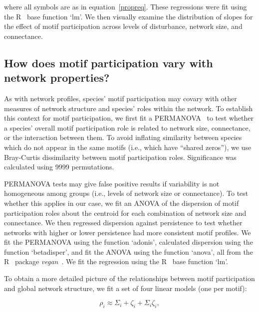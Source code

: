 \documentclass[12pt]{article}
\begin{document}
\begin{spacing}{2.0}
        where all symbols are as in equation~\ref{propreq}.
        These regressions were fit using the R~\citep{R} base function `lm'.
        We then visually examine the distribution of slopes for the effect of motif participation across levels of disturbance, network size, and connectance. 


    \subsection{How does motif participation vary with network properties?}

        As with network profiles, species' motif participation may covary with other measures of network structure and species' roles within the network.
        To establish this context for motif participation, we first fit a PERMANOVA~\citep{Anderson2001} to test whether a species' overall motif participation role is related to network size, connectance, or the interaction between them.
        To avoid inflating similarity between species which do not appear in the same motifs (i.e., which have ``shared zeros''), we use Bray-Curtis dissimilarity between motif participation roles.
        Significance was calculated using 9999 permutations.


        PERMANOVA tests may give false positive results if variability is not homogeneous among groups (i.e., levels of network size or connectance).
        To test whether this applies in our case, we fit an ANOVA of the dispersion of motif participation roles about the centroid for each combination of network size and connectance. 
        We then regressed dispersion against persistence to test whether networks with higher or lower persistence had more consistent motif profiles.
        We fit the PERMANOVA using the function `adonis', calculated dispersion using the function `betadisper', and fit the ANOVA using the function `anova', all from the R~\citep{R} package \emph{vegan}~\citep{vegan}.
        We fit the regression using the R~\citep{R} base function `lm'.


        To obtain a more detailed picture of the relationships between motif participation and global network structure, we fit a set of four linear models (one per motif):

        \begin{equation}
            \rho_{i} \approx \Sigma_{i} + \zeta_{i} + \Sigma_{i}\zeta_{i} ,
            \label{partic_SC}
        \end{equation}
        

\end{spacing}
\end{document}
